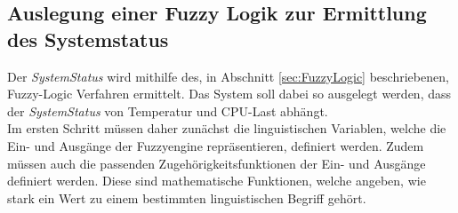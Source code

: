 \subsection{Auslegung einer Fuzzy Logik zur Ermittlung des Systemstatus}\label{sec:SystemStatusErmittelung}
Der \textit{SystemStatus} wird mithilfe des, in Abschnitt \ref{sec:FuzzyLogic} beschriebenen, Fuzzy-Logic Verfahren ermittelt. Das System soll dabei so ausgelegt werden, dass der \textit{SystemStatus} von Temperatur und CPU-Last abhängt.\\
Im ersten Schritt müssen daher zunächst die linguistischen Variablen, welche die Ein- und Ausgänge der Fuzzyengine repräsentieren, definiert werden. Zudem müssen auch die passenden Zugehörigkeitsfunktionen der Ein- und Ausgänge definiert werden. Diese sind mathematische Funktionen, welche angeben, wie stark ein Wert zu einem bestimmten linguistischen Begriff gehört. \cite{FuzzyLogicGeeks}\\ 
\vspace{-1.5cm}
